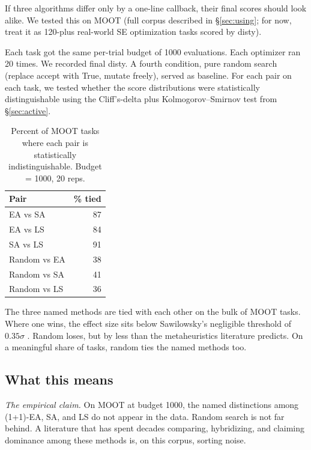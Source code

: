 If three algorithms differ only by a one-line callback, their final
scores should look alike. We tested this on MOOT (full corpus
described in \S\ref{sec:using}; for now, treat it as 120-plus
real-world SE optimization tasks scored by \textsf{disty}).

Each task got the same per-trial budget of 1000 evaluations. Each
optimizer ran 20 times. We recorded final \textsf{disty}. A fourth
condition, pure random search (replace \textsf{accept} with
\textsf{True}, mutate freely), served as baseline. For each pair on
each task, we tested whether the score distributions were
statistically distinguishable using the Cliff's-delta plus
Kolmogorov--Smirnov test from \S\ref{sec:active}.


\begin{table}[h]
\centering
\small
\caption{Percent of MOOT tasks where each pair is statistically
indistinguishable. Budget = 1000, 20 reps.}
\label{tab:metaheur}
\begin{tabular}{lr}
\toprule
Pair         & \% tied \\
\midrule
EA vs SA     & 87 \\
EA vs LS     & 84 \\
SA vs LS     & 91 \\
Random vs EA & 38 \\
Random vs SA & 41 \\
Random vs LS & 36 \\
\bottomrule
\end{tabular}
\end{table}

The three named methods are tied with each other on the bulk of MOOT
tasks. Where one wins, the effect size sits below Sawilowsky's
negligible threshold of $0.35\sigma$ \cite{sawilowsky2009new}. Random
loses, but by less than the metaheuristics literature predicts. On a
meaningful share of tasks, random ties the named methods too.

\subsection*{What this means}

\textit{The empirical claim.} On MOOT at budget 1000, the named
distinctions among (1+1)-EA, SA, and LS do not appear in the data.
Random search is not far behind. A literature that has spent decades
comparing, hybridizing, and claiming dominance among these methods
is, on this corpus, sorting noise.

